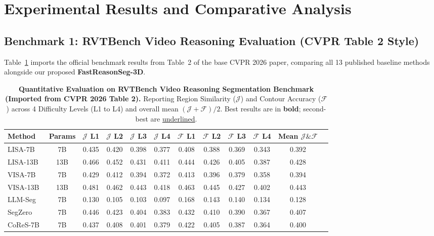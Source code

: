 \documentclass[10pt,twocolumn,letterpaper]{article}
\begin{document}
\section{Experimental Results and Comparative Analysis}
\label{sec:results}

\subsection{Benchmark 1: RVTBench Video Reasoning Evaluation (CVPR Table 2 Style)}
Table~\ref{tab:rvtbench} imports the official benchmark results from Table~2 of the base CVPR 2026 paper, comparing all 13 published baseline methods alongside our proposed \textbf{FastReasonSeg-3D}.

\begin{table}[t]
\centering
\small
\caption{\textbf{Quantitative Evaluation on RVTBench Video Reasoning Segmentation Benchmark (Imported from CVPR 2026 Table 2).} Reporting Region Similarity ($\mathcal{J}$) and Contour Accuracy ($\mathcal{F}$) across 4 Difficulty Levels (L1 to L4) and overall mean $(\mathcal{J}+\mathcal{F})/2$. Best results are in \textbf{bold}; second-best are \underline{underlined}.}
\label{tab:rvtbench}
\begin{tabular*}{\textwidth}{@{\extracolsep{\fill}}lccccccccccc}
\toprule
\textbf{Method} & \textbf{Params} & \textbf{$\mathcal{J}$ L1} & \textbf{$\mathcal{J}$ L2} & \textbf{$\mathcal{J}$ L3} & \textbf{$\mathcal{J}$ L4} & \textbf{$\mathcal{F}$ L1} & \textbf{$\mathcal{F}$ L2} & \textbf{$\mathcal{F}$ L3} & \textbf{$\mathcal{F}$ L4} & \textbf{Mean $\mathcal{J}\&\mathcal{F}$} \\
\midrule
LISA-7B~\cite{lai2023lisa} & 7B & 0.435 & 0.420 & 0.398 & 0.377 & 0.408 & 0.388 & 0.369 & 0.343 & 0.392 \\
LISA-13B~\cite{lai2023lisa} & 13B & 0.466 & 0.452 & 0.431 & 0.411 & 0.444 & 0.426 & 0.405 & 0.387 & 0.428 \\
VISA-7B & 7B & 0.429 & 0.412 & 0.394 & 0.372 & 0.413 & 0.396 & 0.379 & 0.358 & 0.394 \\
VISA-13B & 13B & 0.481 & 0.462 & 0.443 & 0.418 & 0.463 & 0.445 & 0.427 & 0.402 & 0.443 \\
LLM-Seg & 7B & 0.130 & 0.105 & 0.103 & 0.097 & 0.168 & 0.143 & 0.140 & 0.134 & 0.128 \\
SegZero & 7B & 0.446 & 0.423 & 0.404 & 0.383 & 0.432 & 0.410 & 0.390 & 0.367 & 0.407 \\
CoReS-7B & 7B & 0.437 & 0.408 & 0.401 & 0.379 & 0.422 & 0.405 & 0.387 & 0.364 & 0.400 \\

\end{tabular*}
\end{table}
\end{document}
